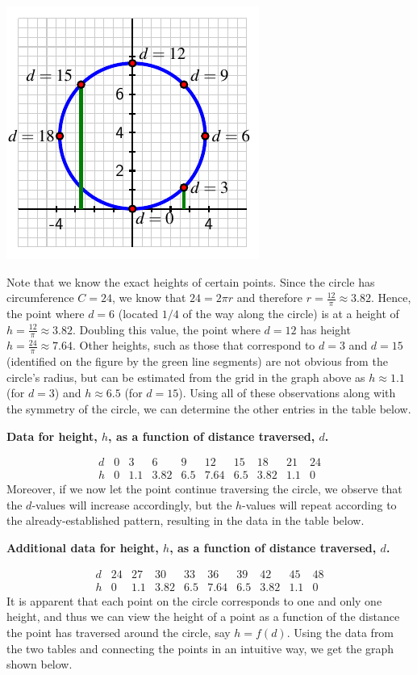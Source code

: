 \documentclass[nooutcomes, noauthor]{ximera}
\begin{document}
\begin{image}
\includegraphics{traversing-first-example.pdf}
\end{image}

Note that we know the exact heights of certain points.  Since the circle has circumference \(C = 24\), we know that \(24 = 2\pi r\) and therefore \(r = \frac{12}{\pi} \approx 3.82\).  Hence, the point where \(d = 6\) (located \(1/4\) of the way along the circle) is at a height of \(h = \frac{12}{\pi} \approx 3.82\).  Doubling this value, the point where \(d = 12\) has height \(h = \frac{24}{\pi} \approx 7.64\).  Other heights, such as those that correspond to \(d = 3\) and \(d = 15\) (identified on the figure by the green line segments) are not obvious from the circle's radius, but can be estimated from the grid in the graph above as \(h \approx 1.1\) (for \(d = 3\)) and \(h \approx 6.5\) (for \(d = 15\)).  Using all of these observations along with the symmetry of the circle, we can determine the other entries in the table below.

\begin{center}
\textbf{Data for height, \(h\), as a function of distance traversed, \(d\).}
\end{center}
$$
\begin{array}{cccccccccc}
d&0&3&6&9&12&15&18&21&24\\
\hline
h&0&1.1&3.82&6.5&7.64&6.5&3.82&1.1&0
\end{array}
$$
Moreover, if we now let the point continue traversing the circle, we observe that the \(d\)-values will increase accordingly, but the \(h\)-values will repeat according to the already-established pattern, resulting in the data in the table below.

\begin{center}
\textbf{Additional data for height, \(h\), as a function of distance traversed, \(d\).}
\end{center}
$$
\begin{array}{cccccccccc}
d&24&27&30&33&36&39&42&45&48\\
\hline
h&0&1.1&3.82&6.5&7.64&6.5&3.82&1.1&0
\end{array}
$$
It is apparent that each point on the circle corresponds to one and only one height, and thus we can view the height of a point as a function of the distance the point has traversed around the circle, say \(h = f(d)\).  Using the data from the two tables and connecting the points in an intuitive way, we get the graph shown below.%
\end{document}
